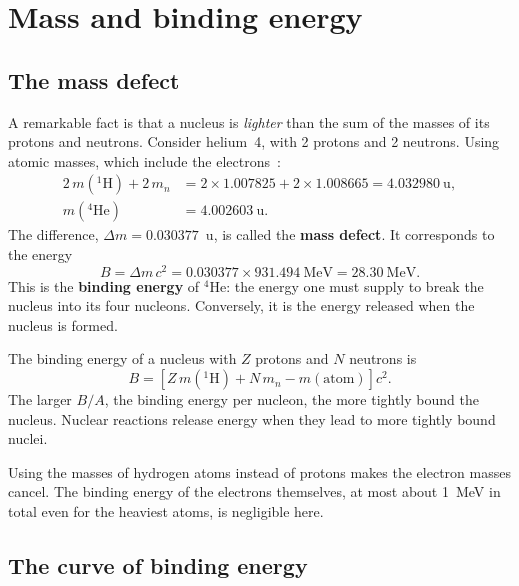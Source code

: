 \documentclass[11pt,a4paper]{article}
\newcommand{\iso}[2]{\ensuremath{{}^{#1}\mathrm{#2}}}         %
\begin{document}
\section{Mass and binding energy}

\subsection{The mass defect}

A remarkable fact is that a nucleus is \emph{lighter} than the sum of the masses of its protons and neutrons. Consider helium~4, with 2 protons and 2 neutrons. Using atomic masses, which include the electrons~\cite{AME2020}:
\begin{align*}
2\,m(\iso{1}{H}) + 2\,m_n &= 2 \times 1.007825 + 2 \times 1.008665 = 4.032980~\text{u},\\
m(\iso{4}{He}) &= 4.002603~\text{u}.
\end{align*}
The difference, $\Delta m = 0.030377$~u, is called the \textbf{mass defect}. It corresponds to the energy
\[
B = \Delta m\, c^2 = 0.030377 \times 931.494~\text{MeV} = 28.30~\text{MeV}.
\]
This is the \textbf{binding energy} of \iso{4}{He}: the energy one must supply to break the nucleus into its four nucleons. Conversely, it is the energy released when the nucleus is formed.

\begin{keybox}
The binding energy of a nucleus with $Z$ protons and $N$ neutrons is
\begin{equation}
  B = \left[ Z\, m(\iso{1}{H}) + N\, m_n - m(\text{atom}) \right] c^2 .
  \label{eq:binding}
\end{equation}
The larger $B/A$, the binding energy per nucleon, the more tightly bound the nucleus. Nuclear reactions release energy when they lead to more tightly bound nuclei.
\end{keybox}

Using the masses of hydrogen atoms instead of protons makes the electron masses cancel. The binding energy of the electrons themselves, at most about 1~MeV in total even for the heaviest atoms, is negligible here.

\subsection{The curve of binding energy}
\end{document}
